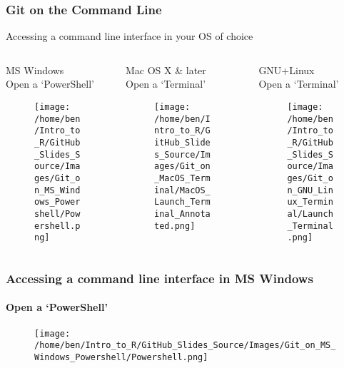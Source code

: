 \documentclass[xcolor=dvipsnames]{beamer}
\begin{document}
\begin{frame}
\frametitle{Git on the Command Line}
Accessing a command line interface in your OS of choice
\begin{columns}

\begin{column}{3.3cm}

\begin{center}
MS Windows\\
Open a `PowerShell'

\begin{figure}
\texttt{[image: /home/ben/Intro\_to\_R/GitHub\_Slides\_Source/Images/Git\_on\_MS\_Windows\_Powershell/Powershell.png]}
\end{figure}

\end{center}

\end{column} 

\begin{column}{3.3cm}
Mac OS X \& later\\
Open a `Terminal'
\begin{center}
\begin{figure}
\texttt{[image: /home/ben/Intro\_to\_R/GitHub\_Slides\_Source/Images/Git\_on\_MacOS\_Terminal/MacOS\_Launch\_Terminal\_Annotated.png]} %
\end{figure}
\end{center}
\end{column} 

\begin{column}{3.3cm}

\begin{center}
GNU+Linux\\
Open a `Terminal'

\begin{figure}
\texttt{[image: /home/ben/Intro\_to\_R/GitHub\_Slides\_Source/Images/Git\_on\_GNU\_Linux\_Terminal/Launch\_Terminal.png]}
\end{figure}

\end{center}

\end{column} 

\end{columns}
\end{frame}

\begin{frame}
\frametitle{Accessing a command line interface in MS Windows}
\framesubtitle{Open a `PowerShell'}
\begin{center}
\begin{figure}
\texttt{[image: /home/ben/Intro\_to\_R/GitHub\_Slides\_Source/Images/Git\_on\_MS\_Windows\_Powershell/Powershell.png]}
\end{figure}
\end{center}
\end{frame}
\end{document}
